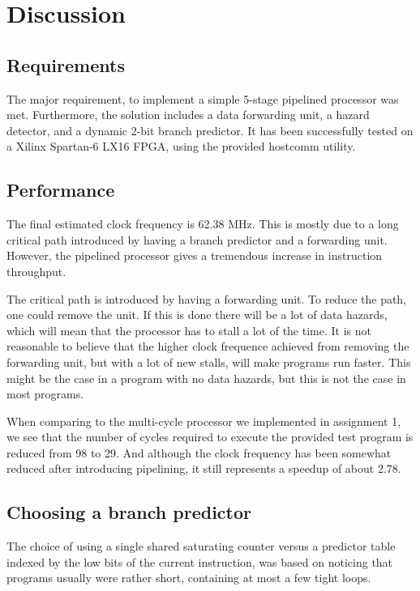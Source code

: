 \chapter{Discussion}

\section{Requirements}
The major requirement, to implement a simple 5-stage pipelined processor was met.
Furthermore, the solution includes a data forwarding unit, a hazard detector, and a dynamic 2-bit branch predictor.
It has been successfully tested on a Xilinx Spartan-6 LX16 FPGA, using the provided hostcomm\cite{hostcomm} utility.

\section{Performance}

The final estimated clock frequency is 62.38 MHz.
This is mostly due to a long critical path introduced by having a branch predictor and a forwarding unit.
However, the pipelined processor gives a tremendous increase in instruction throughput.

The critical path is introduced by having a forwarding unit.
To reduce the path, one could remove the unit.
If this is done there will be a lot of data hazards, which will mean that the processor has to stall a lot of the time.
It is not reasonable to believe that the higher clock frequence achieved from removing the forwarding unit, but with a lot of new stalls, will make programs run faster.
This might be the case in a program with no data hazards, but this is not the case in most programs.

When comparing to the multi-cycle processor we implemented in assignment 1, we see that the number of cycles required to execute the provided test program is reduced from 98 to 29.
And although the clock frequency has been somewhat reduced after introducing pipelining, it still represents a speedup of about 2.78.


\section{Choosing a branch predictor}
The choice of using a single shared saturating counter versus a predictor table indexed by the low bits of the current instruction, was based on noticing that programs usually were rather short, containing at most a few tight loops.

